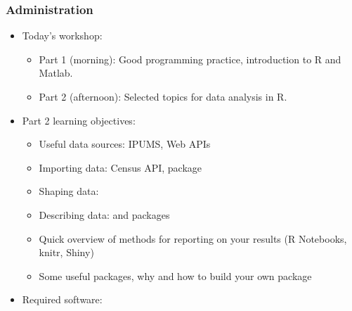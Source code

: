 \documentclass{beamer}
\begin{document}
\begin{frame}[allowframebreaks]
 \frametitle{Administration}

	\begin{itemize}
	\setlength{\itemsep}{\fill}
		\item
		Today's workshop:
		\begin{itemize}
			\item
			Part 1 (morning): Good programming practice, introduction to R and Matlab.
			\item
			Part 2 (afternoon): Selected topics for data analysis in R.
		\end{itemize}
		\vfill
		\item
		Part 2 learning objectives: 
		\begin{itemize}
		    \item
		    Useful data sources: IPUMS, Web APIs
		    \item
		    Importing data: Census API,  package
		    \item
		    Shaping data:  %
		    \item
		    Describing data:  and  packages
		    \item
		    Quick overview of methods for reporting on your results (R Notebooks, knitr, Shiny)
		    \item
		    Some useful packages, why and how to build your own package
		\end{itemize}
		\vfill
		\item
		Required software:
		\begin{columns}[t]
		\begin{column}{0.1\textwidth}
		\end{column}
		\begin{column}{0.8\textwidth}
		\end{column}
		\end{columns}

\end{itemize}
\end{frame}
\end{document}
